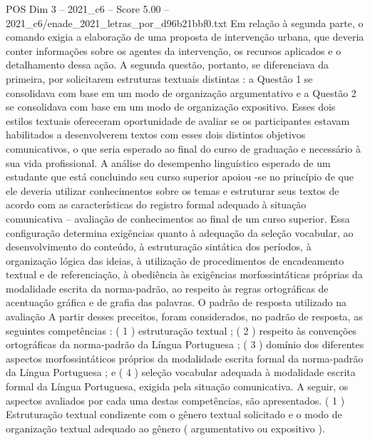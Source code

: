 \begin{textsample}{POS Dim 3 – 2021\_c6 – Score 5.00 – 2021\_c6/enade\_2021\_letras\_por\_d96b21bbf0.txt}
Em relação à segunda parte, o comando exigia a elaboração de uma proposta de intervenção urbana, que deveria conter informações sobre os agentes da intervenção, os recursos aplicados e o detalhamento dessa ação.
A segunda questão, portanto, se diferenciava da primeira, por solicitarem estruturas textuais distintas : a Questão 1 se consolidava com base em um modo de organização argumentativo e a Questão 2 se consolidava com base em um modo de organização expositivo.
Esses dois estilos textuais ofereceram oportunidade de avaliar se os participantes estavam habilitados a desenvolverem textos com esses dois distintos objetivos comunicativos, o que seria esperado ao final do curso de graduação e necessário à sua vida profissional.
A análise do desempenho linguístico esperado de um estudante que está concluindo seu curso superior apoiou -se no princípio de que ele deveria utilizar conhecimentos sobre os temas e estruturar seus textos de acordo com as características do registro formal adequado à situação comunicativa – avaliação de conhecimentos ao final de um curso superior.
Essa configuração determina exigências quanto à adequação da seleção vocabular, ao desenvolvimento do conteúdo, à estruturação sintática dos períodos, à organização lógica das ideias, à utilização de procedimentos de encadeamento textual e de referenciação, à obediência às exigências morfossintáticas próprias da modalidade escrita da norma-padrão, ao respeito às regras ortográficas de acentuação gráfica e de grafia das palavras.
O padrão de resposta utilizado na avaliação A partir desses preceitos, foram considerados, no padrão de resposta, as seguintes competências : ( 1 ) estruturação textual ; ( 2 ) respeito às convenções ortográficas da norma-padrão da Língua Portuguesa ; ( 3 ) domínio dos diferentes aspectos morfossintáticos próprios da modalidade escrita formal da norma-padrão da Língua Portuguesa ; e ( 4 ) seleção vocabular adequada à modalidade escrita formal da Língua Portuguesa, exigida pela situação comunicativa.
A seguir, os aspectos avaliados por cada uma destas competências, são apresentados. ( 1 ) Estruturação textual condizente com o gênero textual solicitado e o modo de organização textual adequado ao gênero ( argumentativo ou expositivo ).

\end{textsample}
